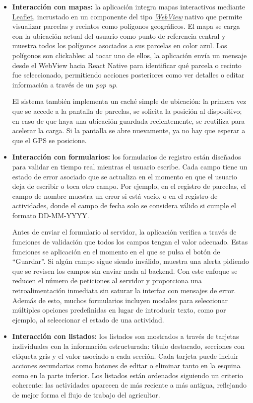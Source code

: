\begin{itemize}
    \item \textbf{Interacción con mapas:} la aplicación integra mapas interactivos mediante \hyperlink{leaflet}{Leaflet}, incrustado en un componente del tipo \hyperlink{webview}{\textit{WebView}} nativo que permite visualizar parcelas y recintos como polígonos 
    geográficos. El mapa se carga con la ubicación actual del usuario como punto de referencia central y muestra todos los polígonos asociados a sus parcelas en color azul. Los polígonos son clickables: al tocar uno de ellos, la aplicación 
    envía un mensaje desde el WebView hacia React Native para identificar qué parcela o recinto fue seleccionado, permitiendo acciones posteriores como ver detalles o editar información a través de un \textit{pop up}.

    El sistema también implementa un caché simple de ubicación: la primera vez que se accede a la pantalla de parcelas, se solicita la posición al dispositivo; en caso de que haya una ubicación guardada recientemente, se reutiliza para acelerar 
    la carga. Si la pantalla se abre nuevamente, ya no hay que esperar a que el GPS se posicione.

    \item \textbf{Interacción con formularios:} los formularios de registro están diseñados para validar en tiempo real mientras el usuario escribe. Cada campo tiene un estado de error asociado que se actualiza en el momento en que el usuario deja de escribir o 
    toca otro campo. Por ejemplo, en el registro de parcelas, el campo de nombre muestra un error si está vacío, o en el registro de actividades, donde el campo de fecha solo se considera válido si cumple el formato DD-MM-YYYY.

    Antes de enviar el formulario al servidor, la aplicación verifica a través de funciones de validación que todos los campos tengan el valor adecuado. Estas funciones se aplicación en el momento en el que se pulsa el botón de ``Guardar''. Si algún campo sigue 
    siendo inválido, muestra una alerta pidiendo que se revisen los campos sin enviar nada al backend. Con este enfoque se reducen el número de peticiones al servidor y proporciona una retroalimentación inmediata sin saturar la interfaz con mensajes de error.
    Además de esto, muchos formularios incluyen modales para seleccionar múltiples opciones predefinidas en lugar de introducir texto, como por ejemplo, al seleccionar el estado de una actividad.

    \item \textbf{Interacción con listados:} los listados son mostrados a través de tarjetas individuales con la información estructurada: título destacado, secciones con etiqueta gris y el valor asociado a cada sección. Cada tarjeta puede incluir acciones secundarias
    como botones de editar o eliminar tanto en la esquina como en la parte inferior. Los listados están ordenados siguiendo un criterio coherente: las actividades aparecen de más reciente a más antigua, reflejando de mejor forma el flujo de trabajo del agricultor.
    

\end{itemize}
